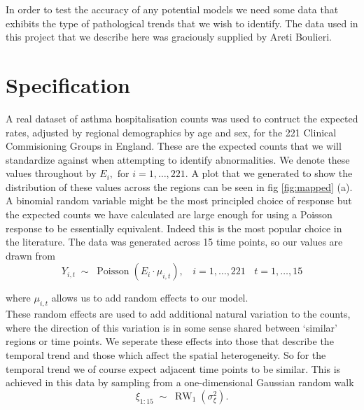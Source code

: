 \documentclass[11pt]{report}
\begin{document}
In order to test the accuracy of any potential models we need some data that exhibits the type of pathological trends that we wish to identify. The data used in this project that we describe here was graciously supplied by Areti Boulieri.

\section{Specification}

A real dataset of asthma hospitalisation counts was used to contruct the expected rates, adjusted by regional demographics by age and sex, for the 221 Clinical Commisioning Groups in England. These are the expected counts that we will standardize against when attempting to identify abnormalities. We denote these values throughout by $E_{i}, \text{ for } i=1,\ldots,221$. A plot that we generated to show the distribution of these values across the regions can be seen in fig \ref{fig:mapped} (a). \\

A binomial random variable might be the most principled choice of response but the expected counts we have calculated are large enough for using a Poisson response to be essentially equivalent. Indeed this is the most popular choice in the literature. The data was generated across 15 time points, so our values are drawn from
\begin{equation}
Y_{i,t} \; \sim \; \operatorname{Poisson}(E_i \cdot \mu_{i,t}), \ \ \ \ i=1,\ldots,221 \ \ \ \ t=1,\ldots,15
\end{equation}

where $\mu_{i,t}$ allows us to add random effects to our model. \\

These random effects are used to add additional natural variation to the counts, where the direction of this variation is in some sense shared between `similar' regions or time points. We seperate these effects into those that describe the temporal trend and those which affect the spatial heterogeneity. So for the temporal trend we of course expect adjacent time points to be similar. This is achieved in this data by sampling from a one-dimensional Gaussian random walk
\begin{equation}
\xi_{1:15} \; \sim \; \operatorname{RW}_1(\sigma_{\xi}^2).
\end{equation}
\end{document}

